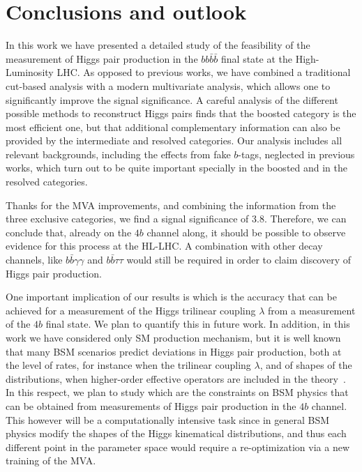 \section{Conclusions and outlook}
\label{sec:conclusions}

In this work we have presented a detailed study of the feasibility
of the measurement of Higgs pair production in the $bb\bar{b}\bar{b}$
final state at the High-Luminosity LHC.
%
As opposed to previous works, we have combined a traditional
cut-based analysis with a modern multivariate analysis,
which allows one to significantly improve the signal significance.
%
A careful analysis of the different possible methods to reconstruct
Higgs pairs finds that the boosted category is the most efficient
one, but that additional complementary information can also be provided
by the intermediate and resolved categories.
%
Our analysis includes all relevant backgrounds, including the
effects from fake $b$-tags, neglected in previous works,
which turn out to be quite important specially
in the boosted and in the resolved categories.

Thanks for the MVA improvements, and combining the information
from the three exclusive categories, we find a signal significance
of 3.8.
%
Therefore, we can conclude that, already on the $4b$ channel along,
it should be possible to observe evidence for this process at
the HL-LHC.
%
A combination with other decay channels, like $b\bar{b}\gamma\gamma$
and $b\bar{b}\tau\tau$ would still be required in order
to claim discovery of Higgs pair production.


One important implication of our results is which is the accuracy
that can be achieved for a measurement of the
Higgs trilinear coupling $\lambda$ from a measurement
of the $4b$ final state.
%
We plan to quantify this in future work.
%
In addition,
in this work we have considered only SM production mechanism,
but it is well known that many BSM scenarios predict deviations
in Higgs pair production, both at the level of rates,
for instance when the trilinear coupling $\lambda$, and of
shapes of the distributions, when higher-order effective
operators are included in the theory~\cite{Azatov:2015oxa}.
%
In this respect, we plan to study which are the constraints
on BSM physics that can be obtained from measurements
of Higgs pair production in the $4b$ channel.
%
This however will be a computationally intensive task since in
general BSM physics modify the shapes of the Higgs kinematical
distributions, and thus each different point in the parameter
space would require a re-optimization via a new training
of the MVA.




